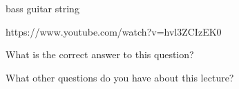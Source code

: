 \documentclass{ximera}
\begin{document}
bass guitar string

https://www.youtube.com/watch?v=hvl3ZCIzEK0

\begin{question}
  What is the correct answer to this question?

  \begin{solution}
    \begin{multiple-choice}
    \end{multiple-choice}  
  \end{solution}
\end{question}

What other questions do you have about this lecture?
\begin{free-response}
\end{free-response}
\end{document}
